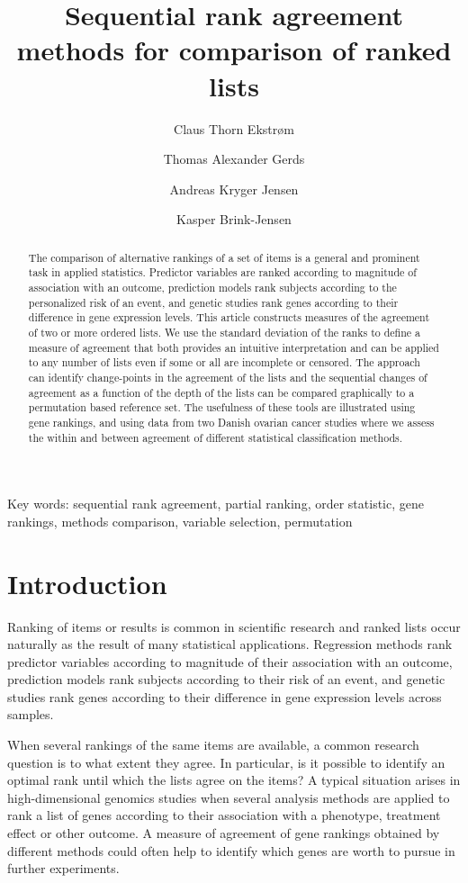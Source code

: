\documentclass[12pt,a4paper]{article}
\title{Sequential rank agreement methods for comparison of ranked lists}
\author{Claus Thorn Ekstrøm}
\author{Thomas Alexander Gerds}
\author{Andreas Kryger Jensen}
\author{Kasper Brink-Jensen}
\affil{Biostatistics, University of Copenhagen}
\theoremstyle{plain}
\begin{document}



\maketitle

\begin{abstract}
  The comparison of alternative rankings of a set of items is a
  general and prominent task in applied statistics. Predictor
  variables are ranked according to magnitude of association with an
  outcome, prediction models rank subjects according to the
  personalized risk of an event, and genetic studies rank genes
  according to their difference in gene expression levels. This
  article constructs measures of the agreement of two or more ordered
  lists. We use the standard deviation of the ranks to define a
  measure of agreement that both provides an intuitive interpretation
  and can be applied to any number of lists even if some or all are
  incomplete or censored. The approach can identify change-points in
  the agreement of the lists and the sequential changes of agreement
  as a function of the depth of the lists can be compared graphically
  to a permutation based reference set.  The usefulness of these tools
  are illustrated using gene rankings, and using data from two Danish
  ovarian cancer studies where we assess the within and between
  agreement of different statistical classification methods.
\end{abstract}

Key words: sequential rank agreement, partial ranking, order
statistic, gene rankings, methods comparison, variable selection,
permutation

\section{Introduction}

Ranking of items or results is common in scientific research and
ranked lists occur naturally as the result of many statistical
applications. Regression methods rank predictor variables according to
magnitude of their association with an outcome, prediction models rank
subjects according to their risk of an event, and genetic studies rank
genes according to their difference in gene expression levels across
samples.


When several rankings of the same items are available, a common
research question is to what extent they agree. In particular, is it
possible to identify an optimal rank until which the lists agree on
the items?  A typical situation arises in high-dimensional genomics
studies when several analysis methods are applied to rank a list of
genes according to their association with a phenotype, treatment
effect or other outcome. A measure of agreement of gene rankings
obtained by different methods could often help to identify which genes
are worth to pursue in further experiments.
\end{document}
